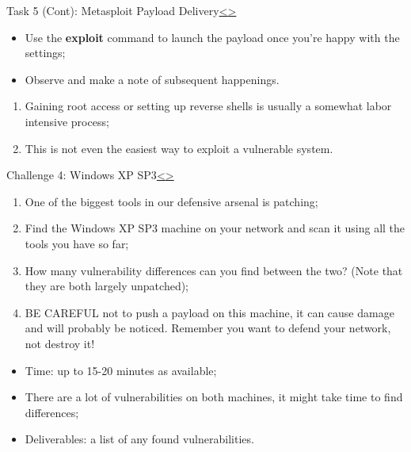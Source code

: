 \documentclass[12pt]{extarticle}
\newenvironment{instructionblock}{\Large\bgroup}{\egroup}
\begin{document}
\pagebreak
\begin{slide}{Task 5 (Cont): Metasploit Payload Delivery}{\hyperref[slide 17]{\textless}\hyperref[slide 19]{\textgreater}}
	\vskip 5pt
	\begin{instructionblock}
	\begin{itemize}
			\item Use the \textbf{exploit} command to launch the payload once you're happy with the settings;
			\item Observe and make a note of subsequent happenings.
		\end{itemize}
	\end{instructionblock}
\end{slide}
\begin{enumerate}
	\item Gaining root access or setting up reverse shells is usually a somewhat labor intensive process;
	\item This is not even the easiest way to exploit a vulnerable system.
\end{enumerate}


\pagebreak
\begin{slide}{Challenge 4: Windows XP SP3}{\hyperref[slide 18]{\textless}\hyperref[slide 20]{\textgreater}}
\vskip 5pt
\begin{instructionblock}
	\begin{enumerate}

	\item One of the biggest tools in our defensive arsenal is patching;
	\item Find the Windows XP SP3 machine on your network and scan it using all the tools you have so far;
	\item How many vulnerability differences can you find between the two? (Note that they are both largely unpatched);
	\item BE CAREFUL not to push a payload on this machine, it can cause damage and will probably be noticed. Remember you want to defend your network, not destroy it!

	\end{enumerate}
\end{instructionblock}
\end{slide}
\begin{itemize}
	\item Time: up to 15-20 minutes as available;
	\item There are a lot of vulnerabilities on both machines, it might take time to find differences;
	\item Deliverables: a list of any found vulnerabilities.
\end{itemize}
\end{document}
